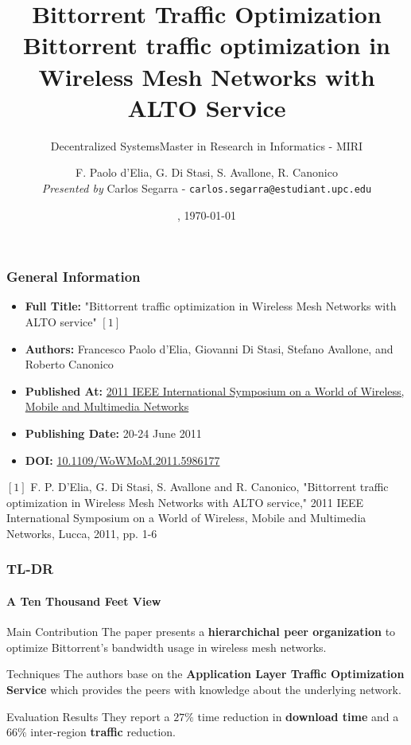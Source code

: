 \documentclass[10pt,    %
    english,            %
    xcolor=table,       %
    envcountsect,        %
    aspectratio=169     %
]{beamer}
\subtitle{Decentralized Systems} %
\title[Decentralized Systems] %
    {\normalsize Bittorrent Traffic Optimization \\ \Large Bittorrent traffic optimization in \\ \Large Wireless Mesh Networks with ALTO Service }
\subtitle{Master in Research in Informatics - MIRI}
\date[\today] %
    {\datedayname, \today}
\author[] %
{F. Paolo d'Elia, G. Di Stasi, S. Avallone, R. Canonico \\\small \textit{Presented by} Carlos Segarra - \texttt{carlos.segarra@estudiant.upc.edu}}
\begin{document}
\begin{frame}
  \titlepage
\end{frame}

\begin{frame}
    \frametitle{General Information}

    \begin{itemize}
        \item \textbf{Full Title:} "Bittorrent traffic optimization in Wireless Mesh Networks with ALTO service" $[1]$
        \item \textbf{Authors:} Francesco Paolo d'Elia, Giovanni Di Stasi, Stefano Avallone, and Roberto Canonico
        \item \textbf{Published At:} \href{https://ieeexplore.ieee.org/xpl/conhome/5976314/proceeding}{2011 IEEE International Symposium on a World of Wireless, Mobile and Multimedia Networks}
        \item \textbf{Publishing Date:} 20-24 June 2011
        \item \textbf{DOI:} \href{https://doi.org/10.1109/WoWMoM.2011.5986177}{10.1109/WoWMoM.2011.5986177}
    \end{itemize}


    \small
    \begin{description}
        \item $[1]$ F. P. D'Elia, G. Di Stasi, S. Avallone and R. Canonico, "Bittorrent traffic optimization in Wireless Mesh Networks with ALTO service," 2011 IEEE International Symposium on a World of Wireless, Mobile and Multimedia Networks, Lucca, 2011, pp. 1-6
    \end{description}
 

\end{frame}

\begin{frame}
    \frametitle{TL-DR}
    \framesubtitle{A Ten Thousand Feet View}

    \vspace{-25pt}

    \begin{alertblock}{Main Contribution}
        The paper presents a \textbf{hierarchichal peer organization} to optimize Bittorrent's bandwidth usage in wireless mesh networks.
    \end{alertblock}

    \begin{block}{Techniques}
        The authors base on the \textbf{Application Layer Traffic Optimization Service} which provides the peers with knowledge about the underlying network.
    \end{block}

    \begin{alertblock}{Evaluation Results}
        They report a $27\%$ time reduction in \textbf{download time} and a $66\%$ inter-region \textbf{traffic} reduction.
    \end{alertblock}

\end{frame}
\end{document}

